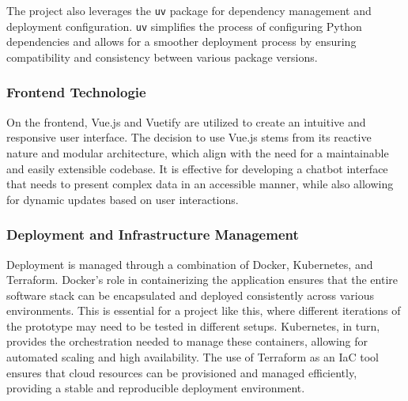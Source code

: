 The project also leverages the \texttt{uv} package for dependency management and deployment configuration. \texttt{uv}
simplifies the process of configuring Python dependencies and allows for a smoother deployment process by ensuring
compatibility and consistency between various package versions.
\autocite[cf.][URL last accessed on 2024-10-05]{canorodriguezPythonPackagingGreat2024}

\subsubsection{Frontend Technologie}

On the frontend, Vue.js and Vuetify are utilized to create an intuitive and responsive user interface.
The decision to use Vue.js stems from its reactive nature and modular architecture, which align with the need for a
maintainable and easily extensible codebase.\autocite[cf.][p. 268]{kaluzaComparisonFrontendFrameworks2018}
\autocite[cf.][pp. 1--2]{liResearchSinglePage2021} It is effective for developing a chatbot interface that needs to
present complex data in an accessible manner, while also allowing for dynamic updates based on user interactions.
\autocite[cf.][p. 493]{mokogintaDevelopingModernJavaScript2024}

\subsubsection{Deployment and Infrastructure Management}

Deployment is managed through a combination of Docker, Kubernetes, and Terraform.
Docker’s role in containerizing the application ensures that the entire software stack can be encapsulated and deployed
consistently across various environments.\autocite[cf.][p. 191]{openjaStudyingPracticesDeploying2022} This is essential
for a project like this, where different iterations of the prototype may need to be tested in different setups.
Kubernetes, in turn, provides the orchestration needed to manage these containers, allowing for automated scaling and
high availability.\autocite[cf.][pp. 2,7-8]{carrionKubernetesSchedulingTaxonomy2022} The use of Terraform as an \ac{IaC}
tool ensures that cloud resources can be provisioned and managed efficiently, providing a stable and reproducible
deployment environment.\autocite[cf.][p. 24]{n.EvaluatingDevopsTools2023}

\vspace{0,75cm}

